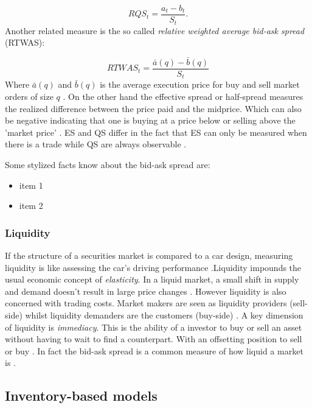 \documentclass{kththesis}
\theoremstyle{definition}
\begin{document}
\begin{equation*}
    RQS_t = \frac{a_t - b_t}{S_t}.
\end{equation*}
Another related measure is the so called \textit{relative weighted average bid-ask spread} (RTWAS):

\begin{equation}
\label{eq:4}
    RTWAS_{t} = \frac{\bar{a}(q) - \bar{b}(q)}{S_t}
\end{equation}
Where $\bar{a}(q)$ and $\bar{b}(q)$ is the average execution price for buy and sell market orders of size $q$ \parencite{foucault2013market}. On the other hand the effective spread or half-spread measures the realized difference between the price paid and the midprice. Which can also be negative indicating that one is buying at a price below or selling above the 'market price' \parencite{cartea2015algorithmic}. ES and QS differ in the fact that ES can only be measured when there is a trade while QS are always observable \parencite{cartea2015algorithmic}.

Some stylized facts know about the bid-ask spread are:
\begin{itemize}
    \item item 1
    \item item 2
\end{itemize}

\subsubsection*{Liquidity}
If the structure of a securities market is compared to a car design, measuring liquidity is like assessing the car's driving performance \parencite{foucault2013market}.Liquidity impounds the usual economic concept of \textit{elasticity}. In a liquid market, a small shift in supply and demand doesn't result in large price changes \parencite{hasbrouck2007empirical}. However liquidity is also concerned with trading costs. Market makers are seen as liquidity providers (sell-side) whilst liquidity demanders are the customers (buy-side) \parencite{hasbrouck2007empirical}. A key dimension of liquidity is \textit{immediacy}. This is the ability of a investor to buy or sell an asset without having to wait to find a counterpart. With an offsetting position to sell or buy \parencite{cartea2015algorithmic}. In fact the bid-ask spread is a common measure of how liquid a market is \parencite{foucault2013market}.

\subsection{Inventory-based models}
\end{document}
